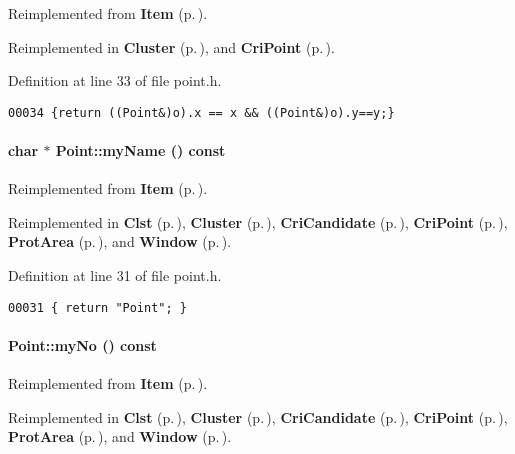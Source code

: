 Reimplemented from {\bf Item} {\rm (p.\,\pageref{Item_a5})}.

Reimplemented in {\bf Cluster} {\rm (p.\,\pageref{Cluster_a5})}, and {\bf Cri\-Point} {\rm (p.\,\pageref{CriPoint_a6})}.

Definition at line 33 of file point.h.\small\begin{verbatim}00034 {return ((Point&)o).x == x && ((Point&)o).y==y;}
\end{verbatim}\normalsize 
\label{Point_a5}
\paragraph{\setlength{\rightskip}{0pt plus 5cm}char $\ast$ Point::my\-Name () const\hspace{0.3cm}{\tt  [inline, virtual]}}\hfill



Reimplemented from {\bf Item} {\rm (p.\,\pageref{Item_a4})}.

Reimplemented in {\bf Clst} {\rm (p.\,\pageref{Clst_a4})}, {\bf Cluster} {\rm (p.\,\pageref{Cluster_a4})}, {\bf Cri\-Candidate} {\rm (p.\,\pageref{CriCandidate_a3})}, {\bf Cri\-Point} {\rm (p.\,\pageref{CriPoint_a4})}, {\bf Prot\-Area} {\rm (p.\,\pageref{ProtArea_a3})}, and {\bf Window} {\rm (p.\,\pageref{Window_a3})}.

Definition at line 31 of file point.h.\small\begin{verbatim}00031 { return "Point"; }
\end{verbatim}\normalsize 
\label{Point_a4}
\paragraph{ Point::my\-No () const\hspace{0.3cm}{\tt  [inline, virtual]}}\hfill



Reimplemented from {\bf Item} {\rm (p.\,\pageref{Item_a3})}.

Reimplemented in {\bf Clst} {\rm (p.\,\pageref{Clst_a3})}, {\bf Cluster} {\rm (p.\,\pageref{Cluster_a3})}, {\bf Cri\-Candidate} {\rm (p.\,\pageref{CriCandidate_a2})}, {\bf Cri\-Point} {\rm (p.\,\pageref{CriPoint_a3})}, {\bf Prot\-Area} {\rm (p.\,\pageref{ProtArea_a2})}, and {\bf Window} {\rm (p.\,\pageref{Window_a2})}.

